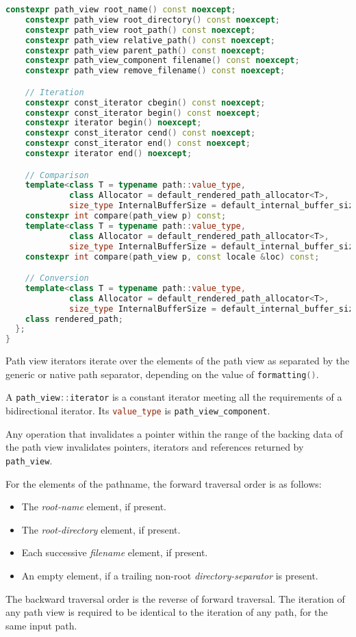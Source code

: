 \documentclass[11pt]{article}
\newcommand{\code}[2][cpp]{\lstinline[language=#1,basicstyle=\small\ttfamily]{#2}}
\begin{document}
\begin{lstlisting}[language=cpp]
    constexpr path_view root_name() const noexcept;
    constexpr path_view root_directory() const noexcept;
    constexpr path_view root_path() const noexcept;
    constexpr path_view relative_path() const noexcept;
    constexpr path_view parent_path() const noexcept;
    constexpr path_view_component filename() const noexcept;
    constexpr path_view remove_filename() const noexcept;

    // Iteration
    constexpr const_iterator cbegin() const noexcept;
    constexpr const_iterator begin() const noexcept;
    constexpr iterator begin() noexcept;
    constexpr const_iterator cend() const noexcept;
    constexpr const_iterator end() const noexcept;
    constexpr iterator end() noexcept;

    // Comparison
    template<class T = typename path::value_type,
             class Allocator = default_rendered_path_allocator<T>,
             size_type InternalBufferSize = default_internal_buffer_size>
    constexpr int compare(path_view p) const;
    template<class T = typename path::value_type,
             class Allocator = default_rendered_path_allocator<T>,
             size_type InternalBufferSize = default_internal_buffer_size>
    constexpr int compare(path_view p, const locale &loc) const;

    // Conversion
    template<class T = typename path::value_type,
             class Allocator = default_rendered_path_allocator<T>,
             size_type InternalBufferSize = default_internal_buffer_size>
    class rendered_path;
  };
}
\end{lstlisting}

Path view iterators iterate over the elements of the path view as separated by the generic or native path separator, depending on the value of \code{formatting()}.

A \code{path_view::iterator} is a constant iterator meeting all the requirements of a bidirectional iterator. Its \code{value_type} is \code{path_view_component}.

Any operation that invalidates a pointer within the range of the backing data of the path view invalidates pointers, iterators and references returned by \code{path_view}.

For the elements of the pathname, the forward traversal order is as follows:

\begin{itemize}
    \item The \emph{root-name} element, if present.
    \item The \emph{root-directory} element, if present.
    \item Each successive \emph{filename} element, if present.
    \item An empty element, if a trailing non-root \emph{directory-separator} is present.
\end{itemize}
The backward traversal order is the reverse of forward traversal. The iteration of any path view is required to be identical to the iteration of any path, for the same input path.
\end{document}
